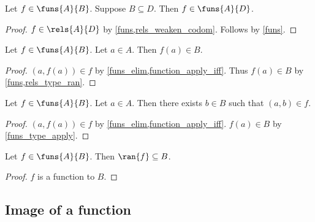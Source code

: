 \begin{proposition}\label{funs_weaken_codom}
    Let $f\in\funs{A}{B}$.
    Suppose $B\subseteq D$.
    Then $f\in\funs{A}{D}$.
\end{proposition}
\begin{proof}
    $f\in\rels{A}{D}$ by \cref{funs,rels_weaken_codom}.
    Follows by \cref{funs}.
\end{proof}

\begin{proposition}\label{funs_type_apply}
    Let $f\in\funs{A}{B}$.
    Let $a\in A$.
    Then $f(a)\in B$.
\end{proposition}
\begin{proof}
    $(a,f(a)) \in f$ by \cref{funs_elim,function_apply_iff}.
    Thus $f(a)\in B$ by \cref{funs,rels_type_ran}.
\end{proof}

\begin{proposition}\label{funs_tuple_intro}
    Let $f\in\funs{A}{B}$.
    Let $a\in A$.
    Then there exists $b\in B$ such that $(a,b)\in f$.
\end{proposition}
\begin{proof}
    $(a,f(a)) \in f$ by \cref{funs_elim,function_apply_iff}.
    $f(a)\in B$ by \cref{funs_type_apply}.
\end{proof}


%
%

\begin{proposition}\label{funs_ran}
    Let $f\in\funs{A}{B}$.
    Then $\ran{f}\subseteq B$.
\end{proposition}
\begin{proof}
    $f$ is a function to $B$.
\end{proof}



\subsection{Image of a function}

